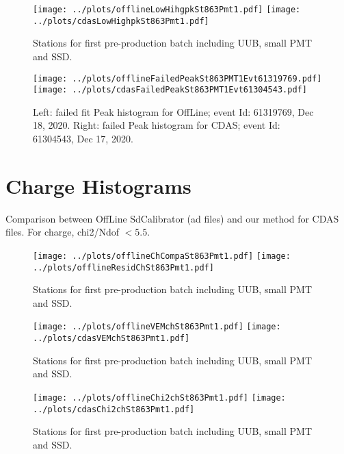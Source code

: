 \documentclass[twoside, final, 10pt]{articleMine}
\begin{document}
\begin{figure}[!tbh]
  \centering
  \subfigure
  {
    \texttt{[image: ../plots/offlineLowHihgpkSt863Pmt1.pdf]}
    \texttt{[image: ../plots/cdasLowHighpkSt863Pmt1.pdf]}
  }
  \caption{Stations for first pre-production batch including UUB, small PMT and SSD.}
  \label{figPkLowHigh}
\end{figure}


\begin{figure}[!tbh]
  \centering
  \subfigure
  {
    \texttt{[image: ../plots/offlineFailedPeakSt863PMT1Evt61319769.pdf]}
    \texttt{[image: ../plots/cdasFailedPeakSt863PMT1Evt61304543.pdf]}
  }
  \caption{Left: failed fit Peak histogram for OffLine; event Id: 61319769, Dec 18, 2020.
  Right: failed Peak histogram for CDAS; event Id: 61304543, Dec 17, 2020.}
  \label{figPkFailsfit}
\end{figure}
\clearpage

\section*{Charge Histograms}
Comparison between OffLine SdCalibrator (ad files) and our method for CDAS files.
For charge, chi2/Ndof $<5.5$.

\begin{figure}[!tbh]
  \centering
  \subfigure
  {
    \texttt{[image: ../plots/offlineChCompaSt863Pmt1.pdf]}
    \texttt{[image: ../plots/offlineResidChSt863Pmt1.pdf]}
  }
  \caption{Stations for first pre-production batch including UUB, small PMT and SSD.}
  \label{figChVemserie}
\end{figure}



\begin{figure}[!tbh]
  \centering
  \subfigure
  {
    \texttt{[image: ../plots/offlineVEMchSt863Pmt1.pdf]}
    \texttt{[image: ../plots/cdasVEMchSt863Pmt1.pdf]}
  }
  \caption{Stations for first pre-production batch including UUB, small PMT and SSD.}
  \label{figChVemserie}
\end{figure}


\begin{figure}[!tbh]
  \centering
  \subfigure
  {
    \texttt{[image: ../plots/offlineChi2chSt863Pmt1.pdf]}
    \texttt{[image: ../plots/cdasChi2chSt863Pmt1.pdf]}
  }
  \caption{Stations for first pre-production batch including UUB, small PMT and SSD.}
  \label{figChChi2serie}
\end{figure}
\end{document}
